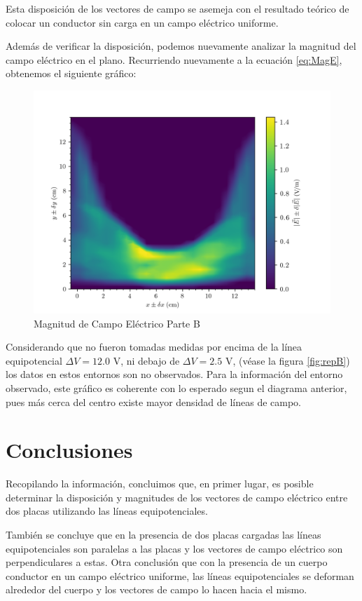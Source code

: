 \documentclass{article}
\begin{document}
Esta disposición de los vectores de campo se asemeja con el resultado teórico de colocar un conductor sin carga en un campo eléctrico uniforme.

Además de verificar la disposición, podemos nuevamente analizar la magnitud del campo eléctrico en el plano. Recurriendo nuevamente a la ecuación \ref{eq:MagE}, obtenemos el siguiente gráfico:

\begin{figure}[H]
  \hspace{-0.1cm}\includegraphics[scale=0.12]{plot3.png}
  \caption{Magnitud de Campo Eléctrico Parte B}
\end{figure}

Considerando que no fueron tomadas medidas por encima de la línea equipotencial $\Delta V = 12.0$ V, ni debajo de $\Delta V = 2.5$ V, (véase la figura \ref{fig:repB}) los datos en estos entornos son no observados. Para la información del entorno observado, este gráfico es coherente con lo esperado segun el diagrama anterior, pues más cerca del centro existe mayor densidad de líneas de campo.

\section{Conclusiones}

Recopilando la información, concluimos que, en primer lugar, es posible determinar la disposición y magnitudes de los vectores de campo eléctrico entre dos placas utilizando las líneas equipotenciales. 

También se concluye que en la presencia de dos placas cargadas las líneas equipotenciales son paralelas a las placas y los vectores de campo eléctrico son perpendiculares a estas. Otra conclusión que con la presencia de un cuerpo conductor en un campo eléctrico uniforme, las líneas equipotenciales se deforman alrededor del cuerpo y los vectores de campo lo hacen hacia el mismo.
\end{document}
